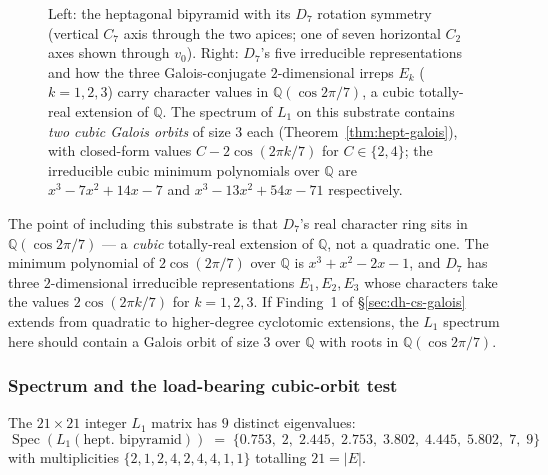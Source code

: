 \documentclass[12pt,a4paper]{article}
\theoremstyle{definition}
\theoremstyle{remark}
\newcommand{\bQ}{\mathbb{Q}}                %
\DeclareMathOperator{\Spec}{Spec}
\begin{document}
\begin{figure}[H]
\caption{Left: the heptagonal bipyramid with its $D_7$ rotation
symmetry (vertical $C_7$ axis through the two apices; one of seven
horizontal $C_2$ axes shown through $v_0$). Right: $D_7$'s
five irreducible representations and how the three Galois-conjugate
$2$-dimensional irreps $E_k$ ($k=1,2,3$) carry character values in
$\bQ(\cos 2\pi/7)$, a cubic totally-real extension of $\bQ$. The
spectrum of $L_1$ on this substrate contains \emph{two cubic Galois
orbits} of size $3$ each (Theorem~\ref{thm:hept-galois}), with
closed-form values $C - 2\cos(2\pi k/7)$ for $C \in \{2, 4\}$; the
irreducible cubic minimum polynomials over $\bQ$ are
$x^3 - 7x^2 + 14x - 7$ and $x^3 - 13x^2 + 54x - 71$ respectively.}
\label{fig:hept-bipyramid}
\end{figure}

The point of including this substrate is that $D_7$'s real character
ring sits in $\bQ(\cos 2\pi/7)$ --- a \emph{cubic} totally-real
extension of $\bQ$, not a quadratic one. The minimum polynomial of
$2\cos(2\pi/7)$ over $\bQ$ is $x^3 + x^2 - 2x - 1$, and $D_7$ has
three $2$-dimensional irreducible representations $E_1, E_2, E_3$
whose characters take the values $2\cos(2\pi k / 7)$ for $k = 1, 2, 3$.
If Finding~1 of \S\ref{sec:dh-cs-galois} extends from quadratic to
higher-degree cyclotomic extensions, the $L_1$ spectrum here should
contain a Galois orbit of size $3$ over $\bQ$ with roots in
$\bQ(\cos 2\pi/7)$.

\subsubsection{Spectrum and the load-bearing cubic-orbit test}\label{sec:hept-spectrum}

The $21 \times 21$ integer $L_1$ matrix has $9$ distinct eigenvalues:
\[
  \Spec(L_1(\text{hept. bipyramid})) \;=\; \{0.753,\; 2,\; 2.445,\; 2.753,\;
  3.802,\; 4.445,\; 5.802,\; 7,\; 9\}
\]
with multiplicities $\{2, 1, 2, 4, 2, 4, 4, 1, 1\}$ totalling $21 = |E|$.
\end{document}
